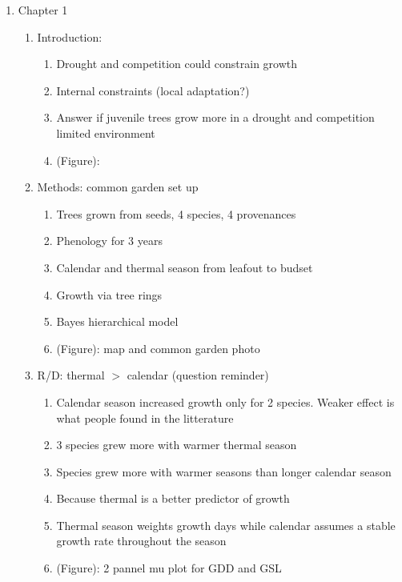 \documentclass{article}\usepackage[]{graphicx}\usepackage[]{xcolor}
\begin{document}
\begin{enumerate}
\begin{enumerate}
  \item Question: do trees grow more with longer and warmer seasons?
    \begin{enumerate}
    \item Objectives: address GS/growth relationship using two systems
    \item Chapter 1: juvenile trees, 4 species, 4 prov, leaf phenology and tree rings
    \item Chapter 2: mature trees, 11 species, leaf phenology and tree rings
    \item (Figure): simplified version of thesis overview figure
    \end{enumerate}
    
  \end{enumerate}

\item Chapter 1
  \begin{enumerate}
  \item Introduction: 
    \begin{enumerate}
    \item Drought and competition could constrain growth
    \item Internal constraints (local adaptation?)
    \item Answer if juvenile trees grow more in a drought and competition limited environment
    \item (Figure):
    \end{enumerate}
    
  \item Methods: common garden set up
    \begin{enumerate}
    \item Trees grown from seeds, 4 species, 4 provenances 
    \item Phenology for 3 years
    \item Calendar and thermal season from leafout to budset
    \item Growth via tree rings
    \item Bayes hierarchical model
    \item (Figure): map and common garden photo
    \end{enumerate}
    
  \item R/D: thermal $>$ calendar (question reminder)
    \begin{enumerate}
    \item Calendar season increased growth only for 2 species. Weaker effect is what people found in the litterature
    \item 3 species grew more with warmer thermal season
    \item Species grew more with warmer seasons than longer calendar season
    \item Because thermal is a better predictor of growth
    \item Thermal season weights growth days while calendar assumes a stable growth rate throughout the season
    \item (Figure): 2 pannel mu plot for GDD and GSL
    \end{enumerate}
  

\end{enumerate}
\end{enumerate}
\end{document}
